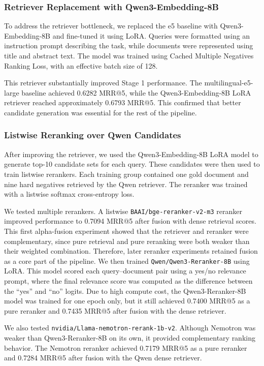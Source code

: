 \documentclass[
]{ceurart}
\begin{document}
\subsubsection{Retriever Replacement with Qwen3-Embedding-8B}

To address the retriever bottleneck, we replaced the e5 baseline with Qwen3-Embedding-8B and fine-tuned it using LoRA. Queries were formatted using an instruction prompt describing the task, while documents were represented using title and abstract text. The model was trained using Cached Multiple Negatives Ranking Loss, with an effective batch size of 128.

This retriever substantially improved Stage 1 performance. The multilingual-e5-large baseline achieved 0.6282 MRR@5, while the Qwen3-Embedding-8B LoRA retriever reached approximately 0.6793 MRR@5. This confirmed that better candidate generation was essential for the rest of the pipeline.

\subsubsection{Listwise Reranking over Qwen Candidates}

After improving the retriever, we used the Qwen3-Embedding-8B LoRA model to generate top-10 candidate sets for each query. These candidates were then used to train listwise rerankers. Each training group contained one gold document and nine hard negatives retrieved by the Qwen retriever. The reranker was trained with a listwise softmax cross-entropy loss.

We tested multiple rerankers. A listwise \texttt{BAAI/bge-reranker-v2-m3} reranker improved performance to 0.7094 MRR@5 after fusion with dense retrieval scores. This first alpha-fusion experiment showed that the retriever and reranker were complementary, since pure retrieval and pure reranking were both weaker than their weighted combination. Therefore, later reranker experiments retained fusion as a core part of the pipeline. We then trained \texttt{Qwen/Qwen3-Reranker-8B} using LoRA. This model scored each query--document pair using a yes/no relevance prompt, where the final relevance score was computed as the difference between the ``yes'' and ``no'' logits. Due to high compute cost, the Qwen3-Reranker-8B model was trained for one epoch only, but it still achieved 0.7400 MRR@5 as a pure reranker and 0.7435 MRR@5 after fusion with the dense retriever.

We also tested \texttt{nvidia/Llama-nemotron-rerank-1b-v2}. Although Nemotron was weaker than Qwen3-Reranker-8B on its own, it provided complementary ranking behavior. The Nemotron reranker achieved 0.7179 MRR@5 as a pure reranker and 0.7284 MRR@5 after fusion with the Qwen dense retriever.
\end{document}
